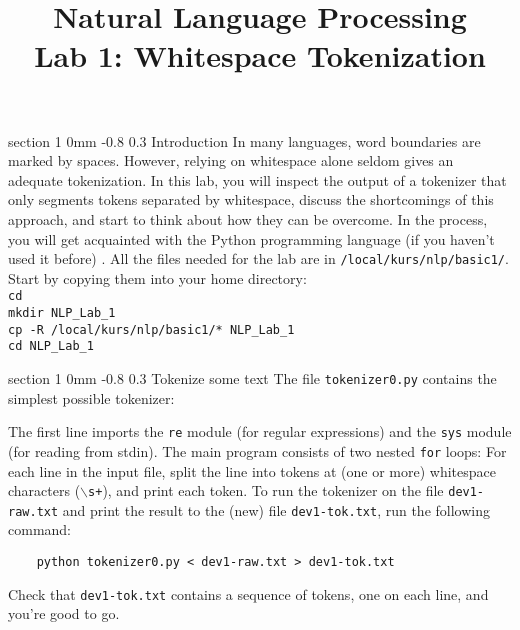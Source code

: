\documentclass[11pt]{article}
\title{{\LARGE Natural Language Processing}\\[1.5mm]{\large Lab 1: Whitespace Tokenization}}
\author{}
\date{} %
\makeatletter
\newcommand{\newsec}[2]{\section{#1}\label{sec:#2}\noindent}
\renewcommand{\section}{\@startsection
{section}%
{1}%
{0mm}%
{-0.8\baselineskip}%
{0.3\baselineskip}%
{\bfseries\large}}%
\makeatother
\begin{document}
 

\maketitle
\vspace{-2mm} \newsec{Introduction}{intro}%
In many languages, word boundaries are marked by spaces. However,
relying on whitespace alone seldom gives an adequate tokenization. In
this lab, you will inspect the output of a tokenizer that only
segments tokens separated by whitespace, discuss the shortcomings of
this approach, and start to think about how they can be overcome. In
the process, you will get acquainted with the Python programming
language (if you haven't used it before) .  All the files needed for
the lab are in {\tt /local/kurs/nlp/basic1/}. Start by copying
them into your home directory:\\
{\tt cd}\\
{\tt mkdir NLP\_Lab\_1}\\
{\tt cp -R /local/kurs/nlp/basic1/* NLP\_Lab\_1}\\
{\tt cd NLP\_Lab\_1}

\newsec{Tokenize some text}{tokenize}%
The file {\tt tokenizer0.py} contains the simplest possible tokenizer:
\begin{center}
\fbox{

}
\end{center}
The first line imports the {\tt re} module (for regular expressions)
and the {\tt sys} module (for reading from stdin). The main program
consists of two nested {\tt for} loops: For each line in the input
file, split the line into tokens at (one or more) whitespace
characters ({\tt {$\backslash$}s+}), and print each token.  To run the
tokenizer on the file {\tt dev1-raw.txt} and print the result to the
(new) file {\tt dev1-tok.txt}, run the following command:
\begin{verbatim}
    python tokenizer0.py < dev1-raw.txt > dev1-tok.txt
\end{verbatim}
Check that {\tt dev1-tok.txt} contains a sequence of tokens, one on
each line, and you're good to go.
\end{document}
